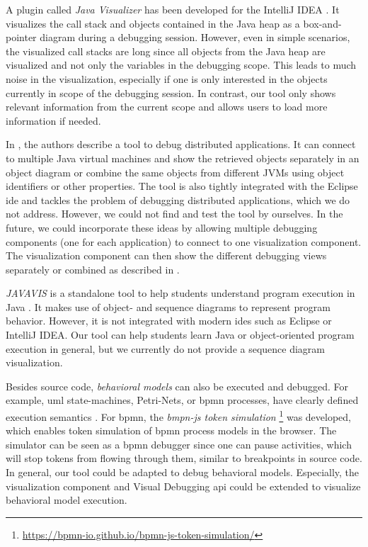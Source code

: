 \documentclass[conference]{IEEEtran}
\newcommand{\intellij}{IntelliJ IDEA}
\begin{document}
A plugin called \textit{Java Visualizer} has been developed for the \intellij{} \cite{JavaVisualizerIntelliJ}.
It visualizes the call stack and objects contained in the Java heap as a box-and-pointer diagram during a debugging session.
However, even in simple scenarios, the visualized call stacks are long since all objects from the Java heap are visualized and not only the variables in the debugging scope.
This leads to much noise in the visualization, especially if one is only interested in the objects currently in scope of the debugging session.
In contrast, our tool only shows relevant information from the current scope and allows users to load more information if needed.

In \cite{kochGraphicalDebuggingDistributed2015}, the authors describe a tool to debug distributed applications.
It can connect to multiple Java virtual machines and show the retrieved objects separately in an object diagram or combine the same objects from different JVMs using object identifiers or other properties.
The tool is also tightly integrated with the Eclipse \gls*{ide} and tackles the problem of debugging distributed applications, which we do not address.
However, we could not find and test the tool by ourselves.
In the future, we could incorporate these ideas by allowing multiple debugging components (one for each application) to connect to one visualization component.
The visualization component can then show the different debugging views separately or combined as described in \cite{kochGraphicalDebuggingDistributed2015}.

\textit{JAVAVIS} is a standalone tool to help students understand program execution in Java \cite{oechsleJAVAVISAutomaticProgram2002}.
It makes use of object- and sequence diagrams to represent program behavior.
However, it is not integrated with modern \glspl*{ide} such as Eclipse or \intellij{}.
Our tool can help students learn Java or object-oriented program execution in general, but we currently do not provide a sequence diagram visualization.

Besides source code, \textit{behavioral models} can also be executed and debugged.
For example, \gls*{uml} state-machines, Petri-Nets, or \gls*{bpmn} processes, have clearly defined execution semantics \cite{objectmanagementgroupUnifiedModelingLanguage2017, objectmanagementgroupBusinessProcessModel2013}.
For \gls*{bpmn}, the \textit{bmpn-js token simulation} \footnote{\url{https://bpmn-io.github.io/bpmn-js-token-simulation/}} was developed, which enables token simulation of \gls*{bpmn} process models in the browser.
The simulator can be seen as a \gls*{bpmn} debugger since one can pause activities, which will stop tokens from flowing through them, similar to breakpoints in source code.
In general, our tool could be adapted to debug behavioral models.
Especially, the visualization component and Visual Debugging \gls*{api} could be extended to visualize behavioral model execution.
\end{document}
